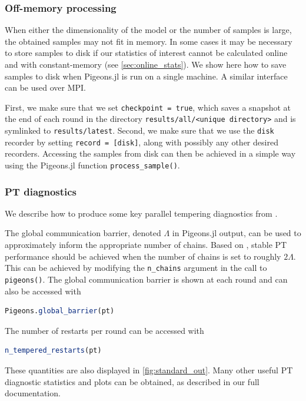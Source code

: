 \subsubsection{Off-memory processing}
When either the dimensionality of the model or the number of samples is large,
the obtained samples may not fit in memory. 
In some cases it may be necessary to store samples to disk if our statistics of 
interest cannot be calculated online and with constant-memory
(see \cref{sec:online_stats}).
We show here how to save samples to disk when Pigeons.jl is run on a single 
machine. A similar interface can be used over MPI. 

\medskip 
First, we make sure that we set \texttt{checkpoint = true}, which saves a 
snapshot at the end of each round in the directory \texttt{results/all/<unique directory>}
and is symlinked to \texttt{results/latest}.
Second, we make sure that we use the \texttt{disk} recorder 
by setting \texttt{record = [disk]}, along with possibly any other desired recorders.
Accessing the samples from disk can then be achieved in a simple way using the Pigeons.jl 
function \texttt{process\_sample()}.


\subsubsection{PT diagnostics}
\label{sec:PT_diagnostics}
We describe how to produce some key parallel tempering diagnostics from 
\cite{syed2021nrpt}.

\medskip 
The global communication barrier, denoted $\Lambda$ in Pigeons.jl output, can be 
used to approximately inform the appropriate number of chains. 
Based on \cite{syed2021nrpt}, stable PT performance should be achieved when  
the number of chains is set to roughly $2\Lambda$. This can be achieved by 
modifying the \texttt{n\_chains} argument in the call to \texttt{pigeons()}. 
The global communication barrier is shown at each round and can also be accessed 
with 
\begin{lstlisting}[language=Julia]
Pigeons.global_barrier(pt)
\end{lstlisting}

The number of restarts per round can be accessed with 
\begin{lstlisting}[language=Julia]
n_tempered_restarts(pt)
\end{lstlisting}
These quantities are also displayed in \cref{fig:standard_out}. 
Many other useful PT diagnostic statistics and plots can be obtained, as described 
in our full documentation. 


